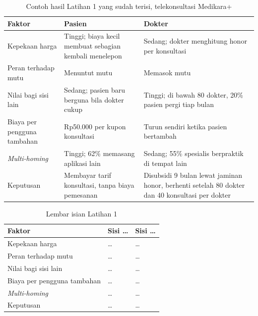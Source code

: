 \begin{table}[!htb]
  \centering
  \caption{Contoh hasil Latihan 1 yang sudah terisi, telekonsultasi Medikara+}
  \label{tab:ch02-lat1-contoh}
  \small
  \begin{tabularx}{\textwidth}{lXX}
    \hline
    \textbf{Faktor} & \textbf{Pasien} & \textbf{Dokter} \\
    \hline
    Kepekaan harga & Tinggi; biaya kecil membuat sebagian kembali menelepon & Sedang; dokter menghitung honor per konsultasi \\
    \hline
    Peran terhadap mutu & Menuntut mutu & Memasok mutu \\
    \hline
    Nilai bagi sisi lain & Sedang; pasien baru berguna bila dokter cukup & Tinggi; di bawah 80 dokter, 20\% pasien pergi tiap bulan \\
    \hline
    Biaya per pengguna tambahan & Rp50.000 per kupon konsultasi & Turun sendiri ketika pasien bertambah \\
    \hline
    \textit{Multi-homing} & Tinggi; 62\% memasang aplikasi lain & Sedang; 55\% spesialis berpraktik di tempat lain \\
    \hline
    Keputusan & Membayar tarif konsultasi, tanpa biaya pemesanan & Disubsidi 9 bulan lewat jaminan honor, berhenti setelah 80 dokter dan 40 konsultasi per dokter \\
    \hline
  \end{tabularx}
\end{table}

\begin{table}[!htb]
  \centering
  \caption{Lembar isian Latihan 1}
  \label{tab:ch02-lat1-hasil}
  \begin{tabularx}{\textwidth}{lXX}
    \hline
    \textbf{Faktor} & \textbf{Sisi \dots} & \textbf{Sisi \dots} \\
    \hline
    Kepekaan harga & \dots & \dots \\
    \hline
    Peran terhadap mutu & \dots & \dots \\
    \hline
    Nilai bagi sisi lain & \dots & \dots \\
    \hline
    Biaya per pengguna tambahan & \dots & \dots \\
    \hline
    \textit{Multi-homing} & \dots & \dots \\
    \hline
    Keputusan & \dots & \dots \\
    \hline
  \end{tabularx}
\end{table}

